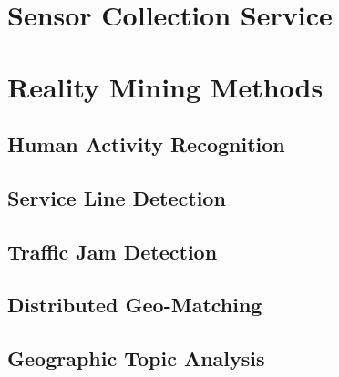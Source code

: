 \documentclass[external]{20120615_deliverable_template_ukob}
\theoremstyle{definition}
\begin{document}
\clearpage
\chapter{Sensor Collection Service}


\clearpage
\chapter{Reality Mining Methods}

\section{Human Activity Recognition}


\section{Service Line Detection}


\section{Traffic Jam Detection}


\section{Distributed Geo-Matching}


\section{Geographic Topic Analysis}



\end{document}
